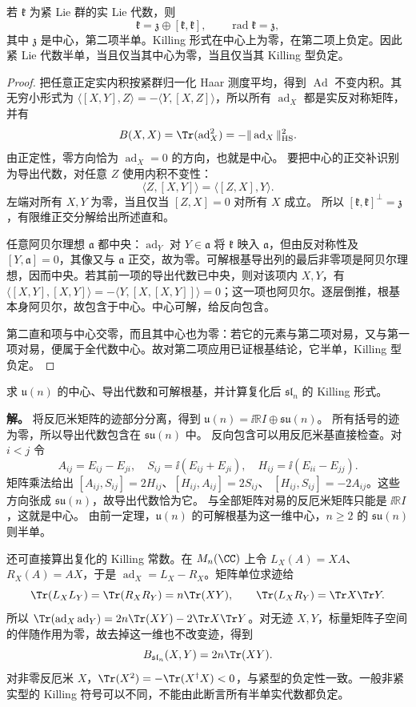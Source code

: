 \begin{theorem}
若 $\mathfrak k$ 为紧 Lie 群的实 Lie 代数，则
\[
 \mathfrak k=\mathfrak z\oplus[\mathfrak k,\mathfrak k],
 \qquad \operatorname{rad}\mathfrak k=\mathfrak z,
\]
其中 $\mathfrak z$ 是中心，第二项半单。Killing 形式在中心上为零，在第二项上负定。因此紧 Lie 代数半单，当且仅当其中心为零，当且仅当其 Killing 型负定。
\end{theorem}
\begin{proof}
把任意正定实内积按紧群归一化 Haar 测度平均，得到 $\operatorname{Ad}$ 不变内积。其无穷小形式为 $\langle[X,Y],Z\rangle=-\langle Y,[X,Z]\rangle$，所以所有 $\operatorname{ad}_X$ 都是实反对称矩阵，并有
\[
 B(X,X)=\Tr(\operatorname{ad}_X^2)
 =-\|\operatorname{ad}_X\|_{\rm HS}^2.
\]
由正定性，零方向恰为 $\operatorname{ad}_X=0$ 的方向，也就是中心。
要把中心的正交补识别为导出代数，对任意 $Z$ 使用内积不变性：
\[
\langle Z,[X,Y]\rangle=\langle[Z,X],Y\rangle.
\]
左端对所有 $X,Y$ 为零，当且仅当 $[Z,X]=0$ 对所有 $X$ 成立。
所以 $[\mathfrak k,\mathfrak k]^\perp=\mathfrak z$，有限维正交分解给出所述直和。

任意阿贝尔理想 $\mathfrak a$ 都中央：$\operatorname{ad}_Y$ 对 $Y\in\mathfrak a$ 将 $\mathfrak k$ 映入 $\mathfrak a$，但由反对称性及 $[Y,\mathfrak a]=0$，其像又与 $\mathfrak a$ 正交，故为零。可解根基导出列的最后非零项是阿贝尔理想，因而中央。若其前一项的导出代数已中央，则对该项内 $X,Y$，有 $\langle[X,Y],[X,Y]\rangle=-\langle Y,[X,[X,Y]]\rangle=0$；这一项也阿贝尔。逐层倒推，根基本身阿贝尔，故包含于中心。中心可解，给反向包含。

第二直和项与中心交零，而且其中心也为零：若它的元素与第二项对易，又与第一项对易，便属于全代数中心。故对第二项应用已证根基结论，它半单，Killing 型负定。
\end{proof}

\begin{workedexample}
求 $\mathfrak u(n)$ 的中心、导出代数和可解根基，并计算复化后 $\mathfrak{sl}_n$ 的 Killing 形式。

\textbf{解。} 将反厄米矩阵的迹部分分离，得到 $\mathfrak u(n)=\ii\mathbb RI\oplus\mathfrak{su}(n)$。
所有括号的迹为零，所以导出代数包含在 $\mathfrak{su}(n)$ 中。
反向包含可以用反厄米基直接检查。对 $i<j$ 令
\[
A_{ij}=E_{ij}-E_{ji},\quad S_{ij}=\ii(E_{ij}+E_{ji}),\quad H_{ij}=\ii(E_{ii}-E_{jj}).
\]
矩阵乘法给出 $[A_{ij},S_{ij}]=2H_{ij}$、$[H_{ij},A_{ij}]=2S_{ij}$、
$[H_{ij},S_{ij}]=-2A_{ij}$。这些方向张成 $\mathfrak{su}(n)$，故导出代数恰为它。
与全部矩阵对易的反厄米矩阵只能是 $\ii\mathbb RI$，这就是中心。
由前一定理，$\mathfrak u(n)$ 的可解根基为这一维中心，$n\ge2$ 的 $\mathfrak{su}(n)$ 则半单。

还可直接算出复化的 Killing 常数。在 $M_n(\CC)$ 上令 $L_X(A)=XA$、$R_X(A)=AX$，于是 $\operatorname{ad}_X=L_X-R_X$。矩阵单位求迹给
\[
 \Tr(L_XL_Y)=\Tr(R_XR_Y)=n\Tr(XY),\qquad
 \Tr(L_XR_Y)=\Tr X\Tr Y.
\]
所以 $\Tr(\operatorname{ad}_X\operatorname{ad}_Y)=2n\Tr(XY)-2\Tr X\Tr Y$。对无迹 $X,Y$，标量矩阵子空间的伴随作用为零，故去掉这一维也不改变迹，得到
\[
 B_{\mathfrak{sl}_n}(X,Y)=2n\Tr(XY).
\]
对非零反厄米 $X$，$\Tr(X^2)=-\Tr(X^\dagger X)<0$，与紧型的负定性一致。一般非紧实型的 Killing 符号可以不同，不能由此断言所有半单实代数都负定。
\end{workedexample}

